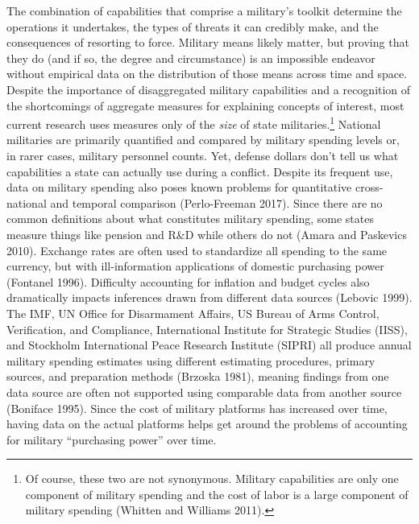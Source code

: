 \documentclass[
]{article}
\begin{document}
The combination of capabilities that comprise a military's toolkit determine the operations it undertakes, the types of threats it can credibly make, and the consequences of resorting to force. Military means likely matter, but proving that they do (and if so, the degree and circumstance) is an impossible endeavor without empirical data on the distribution of those means across time and space. Despite the importance of disaggregated military capabilities and a recognition of the shortcomings of aggregate measures for explaining concepts of interest, most current research uses measures only of the \emph{size} of state militaries.\footnote{Of course, these two are not synonymous. Military capabilities are only one component of military spending and the cost of labor is a large component of military spending (Whitten and Williams 2011).} National militaries are primarily quantified and compared by military spending levels or, in rarer cases, military personnel counts. Yet, defense dollars don't tell us what capabilities a state can actually use during a conflict. Despite its frequent use, data on military spending also poses known problems for quantitative cross-national and temporal comparison (Perlo-Freeman 2017). Since there are no common definitions about what constitutes military spending, some states measure things like pension and R\&D while others do not (Amara and Paskevics 2010). Exchange rates are often used to standardize all spending to the same currency, but with ill-information applications of domestic purchasing power (Fontanel 1996). Difficulty accounting for inflation and budget cycles also dramatically impacts inferences drawn from different data sources (Lebovic 1999). The IMF, UN Office for Disarmament Affairs, US Bureau of Arms Control, Verification, and Compliance, International Institute for Strategic Studies (IISS), and Stockholm International Peace Research Institute (SIPRI) all produce annual military spending estimates using different estimating procedures, primary sources, and preparation methods (Brzoska 1981), meaning findings from one data source are often not supported using comparable data from another source (Boniface 1995). Since the cost of military platforms has increased over time, having data on the actual platforms helps get around the problems of accounting for military ``purchasing power'' over time.
\end{document}
